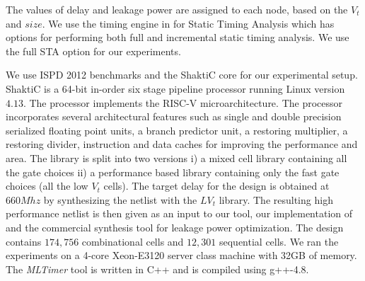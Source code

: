 The values of delay and leakage power are assigned to each node, based on the $V_t$ and $size$. We use the timing engine in \cite{OpenTimer} for Static Timing Analysis which has  options for performing both full and incremental static timing analysis. We use the full STA option for our experiments. 

We use ISPD 2012 \cite{ispd:12} benchmarks and the ShaktiC core for our experimental setup. ShaktiC is a 64-bit in-order six stage pipeline processor running Linux version $4.13$. The processor implements the RISC-V microarchitecture. The processor incorporates several architectural features such as single and double precision serialized floating point units, a branch predictor unit, a restoring  multiplier, a restoring divider, instruction and data caches for improving the performance and area. The library is split into two versions i) a mixed cell library containing all the gate choices ii) a performance based library containing only the fast gate choices (all the low $V_t$ cells). The target delay for the design is obtained at $660Mhz$ by synthesizing the netlist with the $LV_t$ library. The resulting high performance netlist is then given as an input to our tool, our implementation of \cite{hu:12} and the commercial synthesis tool for leakage power optimization. The design contains $174,756$ combinational cells and $12,301$ sequential cells. We ran the experiments on a 4-core Xeon-E3120 server class machine with 32GB of memory. The \textit{MLTimer} tool is written in C++ and is compiled using g++-4.8.
